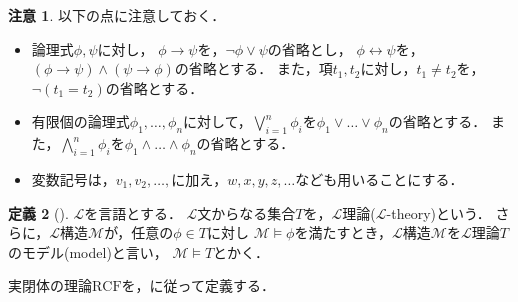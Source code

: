 \documentclass[uplatex, dvipdfmx]{jsarticle}
\numberwithin{equation}{section}
\newcommand{\RCF}{\mathrm{RCF}}
\theoremstyle{definition}
\newtheorem{definition}{定義}[section]
\newtheorem{remark}[definition]{注意}
\begin{document}
\begin{remark}
     以下の点に注意しておく．

     \begin{itemize}
          \item
               論理式$\phi, \psi$に対し，
               $\phi \rightarrow \psi$を，$\lnot \phi \lor \psi$の省略とし，
               $\phi \leftrightarrow \psi$を，$(\phi \rightarrow \psi)\land(\psi \rightarrow \phi)$の省略とする．
               また，項$t_1, t_2$に対し，$t_1 \neq t_2$を，$\lnot(t_1 = t_2)$の省略とする．
          \item
               有限個の論理式$\phi_1, \dots, \phi_n$に対して，$\bigvee_{i=1}^n \phi_i$を$\phi_1 \lor \dots \lor \phi_n$の省略とする．
               また，$\bigwedge_{i=1}^n \phi_i$を$\phi_1 \land \dots \land \phi_n$の省略とする．
          \item     
               変数記号は，$v_1, v_2, \dots, $に加え，$w, x, y, z, \dots$なども用いることにする．
          \end{itemize}
\end{remark}

\begin{definition}[{\cite[Section 1.2]{MR1924282}}]
     $\mathcal{L}$を言語とする．
     $\mathcal{L}$文からなる集合$T$を，$\mathcal{L}$理論($\mathcal{L}$-theory)という．
     さらに，$\mathcal{L}$構造$\mathcal{M}$が，任意の$\phi \in T$に対し
     $\mathcal{M} \models \phi$を満たすとき，$\mathcal{L}$構造$\mathcal{M}$を$\mathcal{L}$理論$T$のモデル(model)と言い，
     $\mathcal{M} \models T$とかく．
\end{definition}

実閉体の理論$\RCF$を，\cite[Chapter 4, Section V]{MR0219380}に従って定義する．
\end{document}
